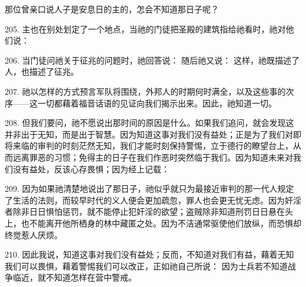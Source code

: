 那位曾亲口说人子是安息日的主的，怎会不知道那日子呢？\par

205. 主也在别处划定了一个地点，当祂的门徒把圣殿的建筑指给祂看时，祂对他们说：\par

206. 当门徒问祂关于征兆的问题时，祂回答说： 随后祂又说： 这样，祂既描述了人，也描述了征兆。\par

207. 祂以怎样的方式预言军队将围绕，外邦人的时期何时满全，以及这些事的次序——这一切都藉着福音话语的见证向我们揭示出来。因此，祂知道一切。\par

\par

208. 但我们要问，祂不愿说出那时间的原因是什么。如果我们追问，就会发现这并非出于无知，而是出于智慧。因为知道这事对我们没有益处；正是为了我们对即将来临的审判的时刻茫然无知，我们才能时刻保持警惕，立于德行的瞭望台上，从而远离罪恶的习惯；免得主的日子在我们作恶时突然临于我们。因为知道未来对我们没有益处，反该心存畏惧；因为经上记载：\par

209. 因为如果祂清楚地说出了那日子，祂似乎就只为最接近审判的那一代人规定了生活的法则，而较早时代的义人便会更加疏忽，罪人也会更无忧无虑。因为奸淫者除非日日惧怕惩罚，就不能停止犯奸淫的欲望；盗贼除非知道刑罚日日悬在头上，也不能离开他所栖身的林中藏匿之处。因为不洁通常驱使他们放纵，而恐惧却终觉惹人厌烦。\par

210. 因此我说，知道这事对我们没有益处；反而，不知道对我们有益，藉着无知我们可以畏惧，藉着警惕我们可以改正，正如祂自己所说： 因为士兵若不知道战争临近，就不知道怎样在营中警戒。\par

